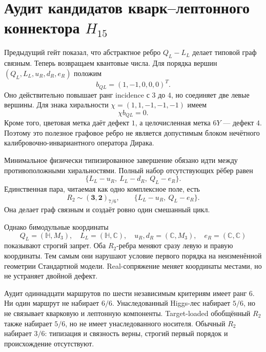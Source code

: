 \chapter{Аудит кандидатов кварк--лептонного коннектора
\texorpdfstring{$H_{15}$}{H15}}
\label{ch:v10-h15-quark-lepton-connector-audit}

Предыдущий гейт показал, что абстрактное ребро $Q_L-L_L$ делает типовой
граф связным. Теперь возвращаем квантовые числа. Для порядка вершин
$(Q_L,L_L,u_R,d_R,e_R)$ положим
\begin{equation}
 b_{QL}=(1,-1,0,0,0)^T.
\end{equation}
Оно действительно повышает ранг incidence с $3$ до $4$, но соединяет две
левые вершины. Для знака хиральности $\chi=(1,1,-1,-1,-1)$ имеем
\begin{equation}
 \chi b_{QL}=0.
\end{equation}
Кроме того, цветовая метка даёт дефект $1$, а целочисленная метка $6Y$ ---
дефект $4$. Поэтому это полезное графовое ребро не является допустимым
блоком нечётного калибровочно-инвариантного оператора Дирака.

Минимальное физически типизированное завершение обязано идти между
противоположными хиральностями. Полный набор отсутствующих рёбер равен
\begin{equation}
 \{L_L-u_R,\ L_L-d_R,\ Q_L-e_R\}.
\end{equation}
Единственная пара, читаемая как одно комплексное поле, есть
\begin{equation}
 R_2\sim(\mathbf3,\mathbf2)_{7/6},\qquad
 \{L_L-u_R,\ Q_L-e_R\}.
\end{equation}
Она делает граф связным и создаёт ровно один смешанный цикл.

Однако бимодульные координаты
\begin{equation}
 Q_L=(\mathbb H,M_3),\quad L_L=(\mathbb H,\mathbb C),\quad
 u_R,d_R=(\mathbb C,M_3),\quad e_R=(\mathbb C,\mathbb C)
\end{equation}
показывают строгий запрет. Оба $R_2$-ребра меняют сразу левую и правую
координаты. Тем самым они нарушают условие первого порядка на неизменённой
геометрии Стандартной модели. Real-сопряжение меняет координаты местами, но
не устраняет двойной дефект.

Аудит одиннадцати маршрутов по шести независимым критериям имеет ранг $6$.
Ни один маршрут не набирает $6/6$. Унаследованный Higgs-лес набирает $5/6$,
но не связывает кварковую и лептонную компоненты. Target-loaded обобщённый
$R_2$ также набирает $5/6$, но не имеет унаследованного носителя. Обычный
$R_2$ набирает $3/6$: типизация и связность верны, строгий первый порядок
и происхождение отсутствуют.

